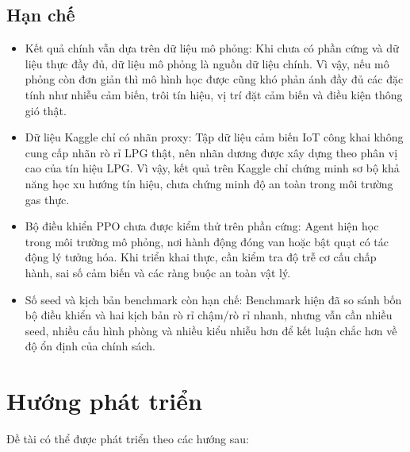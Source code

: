 \subsection{Hạn chế}

\begin{itemize}
  \item Kết quả chính vẫn dựa trên dữ liệu mô phỏng: Khi chưa có phần cứng và dữ liệu thực đầy đủ, dữ liệu mô phỏng là nguồn dữ liệu chính. Vì vậy, nếu mô phỏng còn đơn giản thì mô hình học được cũng khó phản ánh đầy đủ các đặc tính như nhiễu cảm biến, trôi tín hiệu, vị trí đặt cảm biến và điều kiện thông gió thật.

  \item Dữ liệu Kaggle chỉ có nhãn proxy: Tập dữ liệu cảm biến IoT công khai không cung cấp nhãn rò rỉ LPG thật, nên nhãn dương được xây dựng theo phân vị cao của tín hiệu LPG. Vì vậy, kết quả trên Kaggle chỉ chứng minh sơ bộ khả năng học xu hướng tín hiệu, chưa chứng minh độ an toàn trong môi trường gas thực.

  \item Bộ điều khiển PPO chưa được kiểm thử trên phần cứng: Agent hiện học trong môi trường mô phỏng, nơi hành động đóng van hoặc bật quạt có tác động lý tưởng hóa. Khi triển khai thực, cần kiểm tra độ trễ cơ cấu chấp hành, sai số cảm biến và các ràng buộc an toàn vật lý.

  \item Số seed và kịch bản benchmark còn hạn chế: Benchmark hiện đã so sánh bốn bộ điều khiển và hai kịch bản rò rỉ chậm/rò rỉ nhanh, nhưng vẫn cần nhiều seed, nhiều cấu hình phòng và nhiều kiểu nhiễu hơn để kết luận chắc hơn về độ ổn định của chính sách.

\end{itemize}

\section{Hướng phát triển}

Đề tài có thể được phát triển theo các hướng sau:

